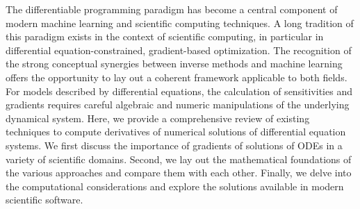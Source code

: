 The differentiable programming paradigm has become a central component of modern machine learning and scientific computing techniques. 
A long tradition of this paradigm exists in the context of scientific computing, in particular in differential equation-constrained, gradient-based optimization.
The recognition of the strong conceptual synergies between inverse methods and machine learning offers the opportunity to lay out a coherent framework applicable to both fields.
For models described by differential equations, the calculation of sensitivities and gradients requires careful algebraic and numeric manipulations of the underlying dynamical system.
Here, we provide a comprehensive review of existing techniques to compute derivatives of numerical solutions of differential equation systems.
We first discuss the importance of gradients of solutions of ODEs in a variety of scientific domains.
Second, we lay out the mathematical foundations of the various approaches and compare them with each other. 
Finally, we delve into the computational considerations and explore the solutions available in modern scientific software. 